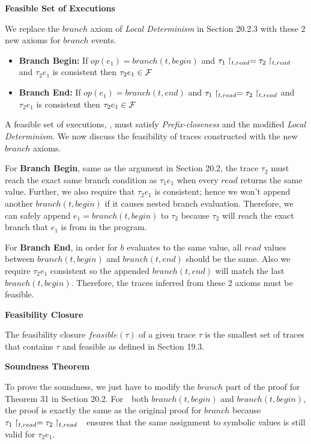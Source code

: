 \documentclass{article}
\begin{document}
\begin{enumerate}
\textbf{Feasible Set of Executions}

We replace the $branch$ axiom of \emph{Local Determinism} in Section 20.2.3
with these 2 new axioms for $branch$ events.
\begin{itemize}
\item \textbf{Branch Begin:}\newline
	If $op(e_1) = branch(t, begin)$ and 
	$\tau_1\upharpoonright_{t,read} = \tau_2\upharpoonright_{t,read}$ and $\tau_2 e_1$ is consistent
	then $\tau_2 e_1 \in \mathcal{F}$
\item \textbf{Branch End:}\newline
	If $op(e_1) = branch(t, end)$ and 
	$\tau_1\upharpoonright_{t,read} = \tau_2\upharpoonright_{t,read}$ and $\tau_2 e_1$ is consistent
	then $\tau_2 e_1 \in \mathcal{F}$
\end{itemize}

A feasible set of executions, \F, must satisfy \emph{Prefix-closeness} and
the modified \emph{Local Determinism}.
We now discuss the feasibility of traces constructed with the new $branch$ axioms.

For \textbf{Branch Begin}, same as the argument in Section 20.2, the trace $\tau_2$ must reach
the exact same branch condition as $\tau_1 e_1$ when every $read$ returns the
same value.
Further, we also require that $\tau_2 e_1$ is consistent;
hence we won't append another $branch(t, begin)$ if it causes nested branch evaluation.
Therefore, we can safely append $e_1 = branch(t, begin)$ to $\tau_2$
because $\tau_2$ will reach the exact branch that $e_1$ is from in the program.

For \textbf{Branch End}, in order for $b$ evaluates to the same value,
all $read$ values between $branch(t, begin)$ and $branch(t, end)$ should be the same.
Also we require $\tau_2 e_1$ consistent so the appended $branch(t, end)$ will match
the last $branch(t, begin)$.
Therefore, the traces inferred from these 2 axioms must be feasible.

\textbf{Feasibility Closure}

The feasibility closure $feasible(\tau)$ of a given trace $\tau$ is the smallest set
of traces that contains $\tau$ and feasible as defined in Section 19.3.  

\textbf{Soundness Theorem}

To prove the soundness, we just have to modify the $branch$ part of the proof for
Theorem 31 in Section 20.2.
For　both $branch(t, begin)$ and $branch(t, begin)$,
the proof is exactly the same as the original proof for $branch$
because $\tau_1\upharpoonright_{t,read} = \tau_2\upharpoonright_{t,read}$　ensures
that the same assignment to symbolic values is still valid for $\tau_2 e_1$.


\end{enumerate}
\end{document}
